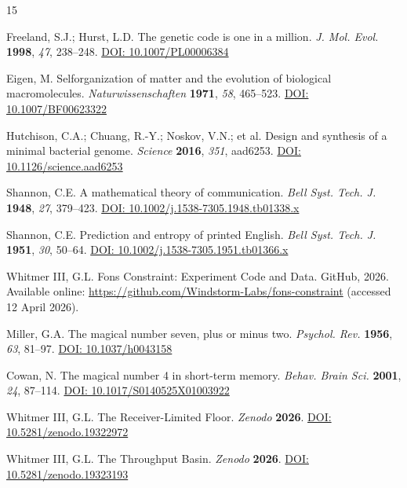 \documentclass[11pt]{article}
\begin{document}
\begin{thebibliography}{15}

Freeland, S.J.; Hurst, L.D.
The genetic code is one in a million.
\textit{J. Mol. Evol.} \textbf{1998}, \textit{47}, 238--248.
\href{https://doi.org/10.1007/PL00006384}{DOI: 10.1007/PL00006384}

Eigen, M.
Selforganization of matter and the evolution of biological macromolecules.
\textit{Naturwissenschaften} \textbf{1971}, \textit{58}, 465--523.
\href{https://doi.org/10.1007/BF00623322}{DOI: 10.1007/BF00623322}

Hutchison, C.A.; Chuang, R.-Y.; Noskov, V.N.; et al.
Design and synthesis of a minimal bacterial genome.
\textit{Science} \textbf{2016}, \textit{351}, aad6253.
\href{https://doi.org/10.1126/science.aad6253}{DOI: 10.1126/science.aad6253}

Shannon, C.E.
A mathematical theory of communication.
\textit{Bell Syst. Tech. J.} \textbf{1948}, \textit{27}, 379--423.
\href{https://doi.org/10.1002/j.1538-7305.1948.tb01338.x}{DOI: 10.1002/j.1538-7305.1948.tb01338.x}

Shannon, C.E.
Prediction and entropy of printed English.
\textit{Bell Syst. Tech. J.} \textbf{1951}, \textit{30}, 50--64.
\href{https://doi.org/10.1002/j.1538-7305.1951.tb01366.x}{DOI: 10.1002/j.1538-7305.1951.tb01366.x}

Whitmer III, G.L.
Fons Constraint: Experiment Code and Data.
GitHub, 2026.
Available online: \url{https://github.com/Windstorm-Labs/fons-constraint} (accessed 12 April 2026).

Miller, G.A.
The magical number seven, plus or minus two.
\textit{Psychol. Rev.} \textbf{1956}, \textit{63}, 81--97.
\href{https://doi.org/10.1037/h0043158}{DOI: 10.1037/h0043158}

Cowan, N.
The magical number 4 in short-term memory.
\textit{Behav. Brain Sci.} \textbf{2001}, \textit{24}, 87--114.
\href{https://doi.org/10.1017/S0140525X01003922}{DOI: 10.1017/S0140525X01003922}

Whitmer III, G.L.
The Receiver-Limited Floor.
\textit{Zenodo} \textbf{2026}.
\href{https://doi.org/10.5281/zenodo.19322972}{DOI: 10.5281/zenodo.19322972}

Whitmer III, G.L.
The Throughput Basin.
\textit{Zenodo} \textbf{2026}.
\href{https://doi.org/10.5281/zenodo.19323193}{DOI: 10.5281/zenodo.19323193}


\end{thebibliography}
\end{document}
